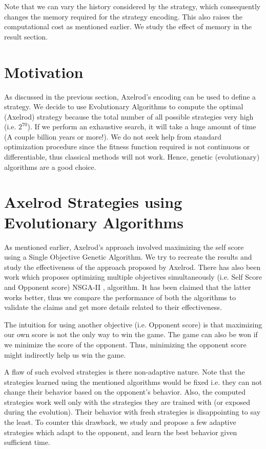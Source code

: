 \documentclass[a4paper]{article}
\begin{document}
	Note that we can vary the history considered by the strategy, which consequently changes the memory required for the strategy encoding. This also raises the computational cost as mentioned earlier. We study the effect of memory in the result section.
	
	\section{Motivation}
	
	As discussed in the previous section, Axelrod's encoding can be used to define a strategy. We decide to use Evolutionary Algorithms to compute the optimal (Axelrod) strategy because the total number of all possible strategies very high (i.e. $2^{70}$). If we perform an exhaustive search, it will take a huge amount of time (A couple billion years or more!). We do not seek help from standard optimization procedure since the fitness function required is not continuous or differentiable, thus classical methods will not work. Hence, genetic (evolutionary) algorithms are a good choice.

	\section{Axelrod Strategies using Evolutionary Algorithms}

	As mentioned earlier, Axelrod's approach involved maximizing the self score using a Single Objective Genetic Algorithm. We try to recreate the results and study the effectiveness of the approach proposed by Axelrod. There has also been work \cite{optimalipd} which proposes optimizing multiple objectives simultaneously (i.e. Self Score and Opponent score) NSGA-II \cite{nsga}, \cite{debmulti} algorithm. It has been claimed that the latter works better, thus we compare the performance of both the algorithms to validate the claims and get more details related to their effectiveness.
	
	The intuition for using another objective (i.e. Opponent score) is that maximizing our own score is not the only way to win the game. The game can also be won if we minimize the score of the opponent. Thus, minimizing the opponent score might indirectly help us win the game.
	
	A flaw of such evolved strategies is there non-adaptive nature. Note that the strategies learned using the mentioned algorithms would be fixed i.e. they can not change their behavior based on the opponent's behavior. Also, the computed strategies work well only with the strategies they are trained with (or exposed during the evolution). Their behavior with fresh strategies is disappointing to say the least. To counter this drawback, we study and propose a few adaptive strategies which adapt to the opponent, and learn the best behavior given sufficient time.
	
\end{document}
